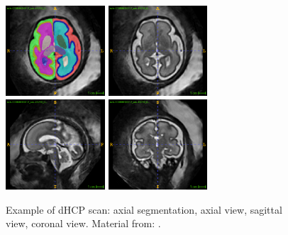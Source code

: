 \begin{figure}[hbtp]
    \centering
    \includegraphics[width=0.33\textwidth]{figures/dhcp_ax_dseg.png}
    \hspace{5pt}
    \includegraphics[width=0.33\textwidth]{figures/dhcp_ax.png} \\
    \vspace{10pt}
    \includegraphics[width=0.33\textwidth]{figures/dhcp_sag.png}
    \hspace{5pt}
    \includegraphics[width=0.33\textwidth]{figures/dhcp_cor.png}
    \caption{Example of dHCP scan: axial segmentation, axial view, sagittal view, coronal view. Material from: \cite{dHCP}.}
    \label{fig:dhcp_images}
\end{figure}

